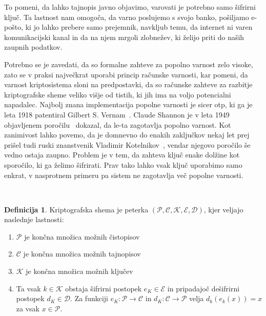 \documentclass[12pt,a4paper,openany,tikz]{book}
\theoremstyle{plain}
\theoremstyle{definition}
\newtheorem{defn}[thm]{Definicija} %
\begin{document}
To pomeni, da lahko tajnopis javno objavimo, varovati je potrebno samo šifrirni ključ. Ta lastnost nam omogoča, da varno poslujemo s svojo banko, pošiljamo e-pošto, ki jo lahko prebere samo prejemnik, navkljub temu, da internet ni varen komunikacijski kanal in da na njem mrgoli zlobnežev, ki želijo priti do naših zaupnih podatkov.

Potrebno se je zavedati, da so formalne zahteve za popolno varnost zelo visoke, zato se v praksi največkrat uporabi princip računske varnosti, kar pomeni, da varnost kriptosistema sloni na predpostavki, da so računske zahteve za razbitje kriptografske sheme veliko višje od tistih, ki jih ima na voljo potencialni napadalec. Najbolj znana implementacija popolne varnosti je sicer \gls{otp}, ki ga je leta 1918 patentiral Gilbert S. Vernam~\cite{vernam1919secret}. Claude Shannon je v leta 1949 objavljenem poročilu~\cite{shannon1949communication} dokazal, da le-ta zagotavlja popolno varnost. Kot zanimivost lahko povemo, da je domnevno do enakih zaključkov nekaj let prej prišel tudi ruski znanstvenik Vladimir Kotelnikov~\cite{molotkov2006quantum}, vendar njegovo poročilo še vedno ostaja zaupno. Problem  je v tem, da zahteva ključ enake dolžine kot sporočilo, ki ga želimo šifrirati. Prav tako lahko vsak ključ uporabimo samo enkrat, v nasprotnem primeru pa sistem ne zagotavlja več popolne varnosti.

\

\begin{mdframed}[frametitle={Kriptografska shema}]
\begin{minipage}{\textwidth}
\begin{defn}
\label{def:cryptosystem}
Kriptografska shema je peterka  $(\mathcal{P}, \mathcal{C}, \mathcal{K},  \mathcal{E}, \mathcal{D})$, kjer veljajo naslednje lastnosti:
	\begin{enumerate}
		\item $\mathcal{P}$ je končna množica možnih čistopisov
		\item $\mathcal{C}$ je končna množica možnih tajnopisov
		\item $\mathcal{K}$ je končna množica možnih ključev
		\item Ta vsak $k \in \mathcal{K}$ obstaja šifrirni postopek $e_K \in \mathcal{E}$ in pripadajoč dešifrirni postopek $d_K \in \mathcal{D}$. Za funkciji $e_K: \mathcal{P} \rightarrow \mathcal{C}$ in $d_K: \mathcal{C} \rightarrow \mathcal{P}$ velja $d_k(e_k(x)) = x$ za vsak $x \in \mathcal{P}$.
	\end{enumerate}
\end{defn}
\end{minipage}
\end{mdframed}
\end{document}
